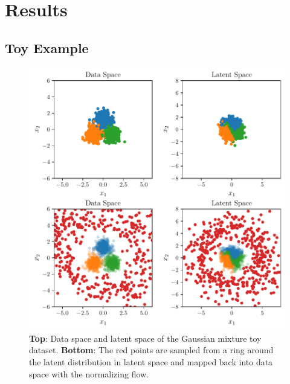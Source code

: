 \chapter{Results}%
\label{cha:results}


\section{Toy Example}%
\label{sec:toy_example}

\begin{figure}[htpb] \centering
        \includegraphics{figures/toy_example/gaussian_mixture/latent_mapping.pdf}
        \caption{\textbf{Top}: Data space and latent space of the Gaussian
        mixture toy dataset. \textbf{Bottom}: The red points are sampled from a
    ring around the latent distribution in latent space and mapped back into
data space with the normalizing flow.}%
	\label{fig:latent_gmm}
\end{figure}

